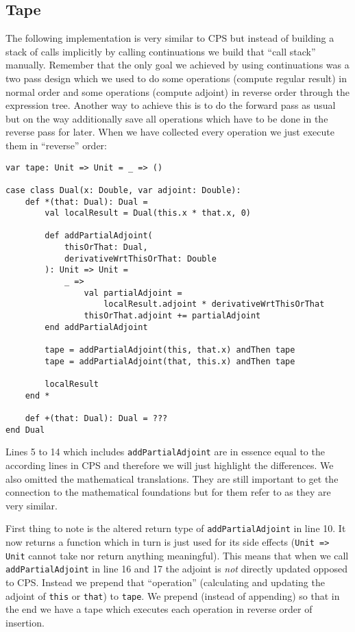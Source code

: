 \subsection{Tape} \label{sec:tape}

The following implementation is very similar to CPS but instead of building a stack of calls implicitly by calling continuations we build that ``call stack'' manually. Remember that the only goal we achieved by using continuations was a two pass design which we used to do some operations (compute regular result) in normal order and some operations (compute adjoint) in reverse order through the expression tree. Another way to achieve this is to do the forward pass as usual but on the way additionally save all operations which have to be done in the reverse pass for later. When we have collected every operation we just execute them in ``reverse'' order:
\begin{lstlisting}[mathescape=true]
var tape: Unit => Unit = _ => ()

case class Dual(x: Double, var adjoint: Double):
    def *(that: Dual): Dual =
        val localResult = Dual(this.x * that.x, 0)

        def addPartialAdjoint(
            thisOrThat: Dual,
            derivativeWrtThisOrThat: Double
        ): Unit => Unit =
            _ =>
                val partialAdjoint = 
                    localResult.adjoint * derivativeWrtThisOrThat
                thisOrThat.adjoint += partialAdjoint
        end addPartialAdjoint

        tape = addPartialAdjoint(this, that.x) andThen tape
        tape = addPartialAdjoint(that, this.x) andThen tape

        localResult
    end *

    def +(that: Dual): Dual = ???
end Dual
\end{lstlisting}
Lines 5 to 14 which includes \lstinline{addPartialAdjoint} are in essence equal to the according lines in CPS and therefore we will just highlight the differences. We also omitted the mathematical translations. They are still important to get the connection to the mathematical foundations but for them refer to  as they are very similar.

First thing to note is the altered return type of \lstinline{addPartialAdjoint} in line 10. It now returns a function which in turn is just used for its side effects (\lstinline{Unit => Unit} cannot take nor return anything meaningful). This means that when we call \lstinline{addPartialAdjoint} in line 16 and 17 the adjoint is \emph{not} directly updated opposed to CPS. Instead we prepend that ``operation'' (calculating and updating the adjoint of \lstinline{this} or \lstinline{that}) to \lstinline{tape}. We prepend (instead of appending) so that in the end we have a tape which executes each operation in reverse order of insertion. 


